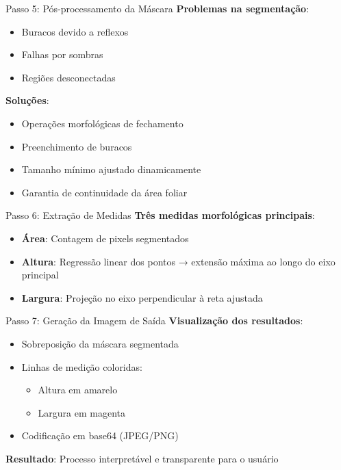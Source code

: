 \documentclass[landscape, 12pt]{beamer}
\begin{document}
\begin{frame}{Passo 5: Pós-processamento da Máscara}
    \textbf{Problemas na segmentação}:
    \begin{itemize}
        \item Buracos devido a reflexos
        \item Falhas por sombras
        \item Regiões desconectadas
    \end{itemize}
    
    \vspace{0.5cm}
    \textbf{Soluções}:
    \begin{itemize}
        \item Operações morfológicas de fechamento
        \item Preenchimento de buracos
        \item Tamanho mínimo ajustado dinamicamente
        \item Garantia de continuidade da área foliar
    \end{itemize}
\end{frame}

\begin{frame}{Passo 6: Extração de Medidas}
    \textbf{Três medidas morfológicas principais}:
    
    \vspace{0.5cm}
    \begin{itemize}
        \item \textbf{Área}: Contagem de pixels segmentados
        \item \textbf{Altura}: Regressão linear dos pontos → extensão máxima ao longo do eixo principal
        \item \textbf{Largura}: Projeção no eixo perpendicular à reta ajustada
    \end{itemize}
\end{frame}

\begin{frame}{Passo 7: Geração da Imagem de Saída}
    \textbf{Visualização dos resultados}:
    \begin{itemize}
        \item Sobreposição da máscara segmentada
        \item Linhas de medição coloridas:
        \begin{itemize}
            \item Altura em amarelo
            \item Largura em magenta
        \end{itemize}
        \item Codificação em base64 (JPEG/PNG)
    \end{itemize}
    
    \vspace{0.5cm}
    \textbf{Resultado}: Processo interpretável e transparente para o usuário
\end{frame}
\end{document}
